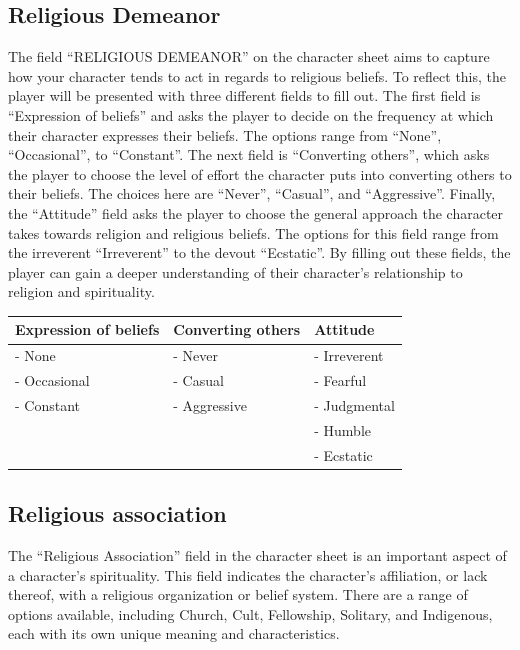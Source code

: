 \hypertarget{religious-demeanor}{%
\subsection{Religious Demeanor}\label{religious-demeanor}}

The field ``RELIGIOUS DEMEANOR'' on the character sheet aims to capture
how your character tends to act in regards to religious beliefs. To
reflect this, the player will be presented with three different fields
to fill out. The first field is ``Expression of beliefs'' and asks the
player to decide on the frequency at which their character expresses
their beliefs. The options range from ``None'', ``Occasional'', to
``Constant''. The next field is ``Converting others'', which asks the
player to choose the level of effort the character puts into converting
others to their beliefs. The choices here are ``Never'', ``Casual'', and
``Aggressive''. Finally, the ``Attitude'' field asks the player to
choose the general approach the character takes towards religion and
religious beliefs. The options for this field range from the irreverent
``Irreverent'' to the devout ``Ecstatic''. By filling out these fields,
the player can gain a deeper understanding of their character's
relationship to religion and spirituality.

\begin{longtable}[]{@{}lll@{}}
\toprule
Expression of beliefs & Converting others & Attitude \\
\midrule
\endhead
- None & - Never & - Irreverent \\
- Occasional & - Casual & - Fearful \\
- Constant & - Aggressive & - Judgmental \\
& & - Humble \\
& & - Ecstatic \\
\bottomrule
\end{longtable}

\hypertarget{religious-association}{%
\subsection{Religious association}\label{religious-association}}

The ``Religious Association'' field in the character sheet is an
important aspect of a character's spirituality. This field indicates the
character's affiliation, or lack thereof, with a religious organization
or belief system. There are a range of options available, including
Church, Cult, Fellowship, Solitary, and Indigenous, each with its own
unique meaning and characteristics.

